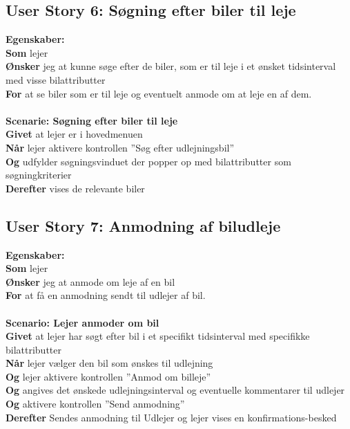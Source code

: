 \documentclass[Kravspecifikation/Kravspec_Main.tex]{subfiles}
\begin{document}
\subsection{User Story 6: Søgning efter biler til leje}
\textbf{Egenskaber:} \\
\textbf{Som} lejer \\
\textbf{Ønsker} jeg at kunne søge efter de biler, som er til leje i et ønsket tidsinterval med visse bilattributter \\
\textbf{For} at se biler som er til leje og eventuelt anmode om at leje en af dem.
\\\\
\textbf{Scenarie: Søgning efter biler til leje} \\
\textbf{Givet} at lejer er i hovedmenuen \\
\textbf{Når} lejer aktivere kontrollen ''Søg efter udlejningsbil'' \\
\textbf{Og} udfylder søgningsvinduet der popper op med bilattributter som søgningkriterier \\
\textbf{Derefter} vises de relevante biler

\subsection{User Story 7: Anmodning af biludleje}
\textbf{Egenskaber:} \\
\textbf{Som} lejer \\
\textbf{Ønsker} jeg at anmode om leje af en bil\\
\textbf{For} at få en anmodning sendt til udlejer af bil. 
\\\\
\textbf{Scenario: Lejer anmoder om bil} \\
\textbf{Givet} at lejer har søgt efter bil i et specifikt tidsinterval med specifikke bilattributter \\
\textbf{Når} lejer vælger den bil som ønskes til udlejning \\  
\textbf{Og} lejer aktivere kontrollen ''Anmod om billeje'' \\
\textbf{Og} angives det ønskede udlejningsinterval og eventuelle kommentarer til udlejer \\
\textbf{Og} aktivere kontrollen ''Send anmodning'' \\
\textbf{Derefter} Sendes anmodning til Udlejer og lejer vises en konfirmations-besked
\end{document}
